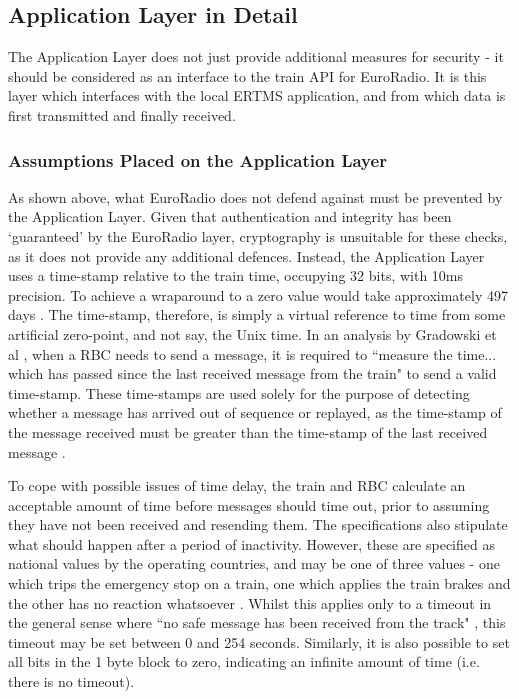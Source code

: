 \documentclass[twoside,11pt,a4paper]{article}
\begin{document}
\subsection{Application Layer in Detail}
The Application Layer does not just provide additional measures for security - it should be considered as an interface to the train API for EuroRadio. It is this layer which interfaces with the local ERTMS application, and from which data is first transmitted and finally received.

\subsubsection{Assumptions Placed on the Application Layer}
As shown above, what EuroRadio does not defend against must be prevented by the Application Layer. Given that authentication and integrity has been `guaranteed' by the EuroRadio layer, cryptography is unsuitable for these checks, as it does not provide any additional defences. Instead, the Application Layer uses a time-stamp relative to the train time, occupying 32 bits, with 10ms precision. To achieve a wraparound to a zero value would take approximately 497 days \citep[Section 7.5.1.154]{SUBSET-026-7}. The time-stamp, therefore, is simply a virtual reference to time from some artificial zero-point, and not say, the Unix time. In an analysis by Gradowski et al \citep{Gradowski14a}, when a RBC needs to send a message, it is required to ``measure the time... which has passed since the last received message from the train" to send a valid time-stamp. These time-stamps are used solely for the purpose of detecting whether a message has arrived out of sequence or replayed, as the time-stamp of the message received must be greater than the time-stamp of the last received message \citep{Ansaldo05a}. 

To cope with possible issues of time delay, the train and RBC calculate an acceptable amount of time before messages should time out, prior to assuming they have not been received and resending them. The specifications also stipulate what should happen after a period of inactivity. However, these are specified as national values by the operating countries, and may be one of three values - one which trips the emergency stop on a train, one which applies the train brakes and the other has no reaction whatsoever \citep{RSSB12a}. Whilst this applies only to a timeout in the general sense where ``no safe message has been received from the track" \citep[p. 81]{SUBSET-026-7}, this timeout may be set between 0 and 254 seconds. Similarly, it is also possible to set all bits in the 1 byte block to zero, indicating an infinite amount of time (i.e. there is no timeout).
\end{document}
